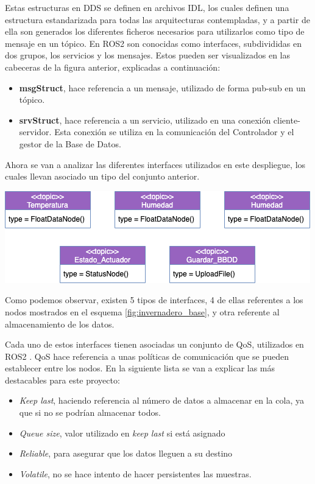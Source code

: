 Estas estructuras en DDS se definen en archivos \ac{IDL}, los cuales definen una estructura estandarizada para todas las arquitecturas contempladas, y a partir de ella son generados los diferentes ficheros necesarios para utilizarlos como tipo de mensaje en un tópico. En ROS2 son conocidas como interfaces, subdivididas en dos grupos, los servicios y los mensajes. Estos pueden ser visualizados en las cabeceras de la figura anterior, explicadas a continuación:

\begin{itemize}
    \item \textbf{msgStruct}, hace referencia a un mensaje, utilizado de forma pub-sub en un tópico.
    \item \textbf{srvStruct}, hace referencia a un servicio, utilizado en una conexión cliente-servidor. Esta conexión se utiliza en la comunicación del Controlador y el gestor de la Base de Datos.
\end{itemize}

Ahora se van a analizar las diferentes interfaces utilizados en este despliegue, los cuales llevan asociado un tipo del conjunto anterior.

\begin{center}
    \centering
    \includegraphics[width=\textwidth]{img/05-Topicos.png}
    \label{fig:topicos}
\end{center}

Como podemos observar, existen 5 tipos de interfaces, 4 de ellas referentes a los nodos mostrados en el esquema \ref{fig:invernadero_base}, y otra referente al almacenamiento de los datos.

Cada uno de estos interfaces tienen asociadas un conjunto de \ac{QoS}, utilizados en ROS2 \cite{qos-ros}. QoS hace referencia a unas políticas de comunicación que se pueden establecer entre los nodos. En la siguiente lista se van a explicar las más destacables para este proyecto:

\begin{itemize}
    \item \textit{Keep last}, haciendo referencia al número de datos a almacenar en la cola, ya que si no se podrían almacenar todos.
    \item \textit{Queue size}, valor utilizado en \textit{keep last} si está asignado
    \item \textit{Reliable}, para asegurar que los datos lleguen a su destino
    \item \textit{Volatile}, no se hace intento de hacer persistentes las muestras.
\end{itemize}


